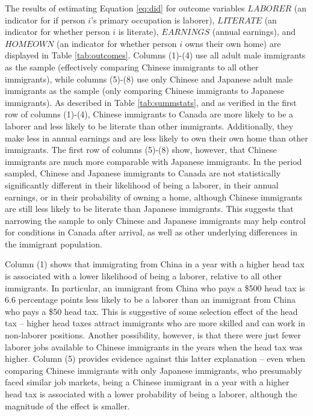 The results of estimating Equation \ref{eq:did} for outcome variables $LABORER$ (an indicator for if person $i$'s primary occupation is laborer), $LITERATE$ (an indicator for whether person $i$ is literate), $EARNINGS$ (annual earnings), and $HOMEOWN$ (an indicator for whether person $i$ owns their own home) are displayed in Table \ref{tab:outcomes}. Columns (1)-(4) use all adult male immigrants as the sample (effectively comparing Chinese immigrants to all other immigrants), while columns (5)-(8) use only Chinese and Japanese adult male immigrants as the sample (only comparing Chinese immigrants to Japanese immigrants). 
As described in Table \ref{tab:summstats}, and as verified in the first row of columns (1)-(4), Chinese immigrants to Canada are more likely to be a laborer and less likely to be literate than other immigrants. Additionally, they make less in annual earnings and are less likely to own their own home than other immigrants. The first row of columns (5)-(8) show, however, that Chinese immigrants are much more comparable with Japanese immigrants. In the period sampled, Chinese and Japanese immigrants to Canada are not statistically significantly different in their likelihood of being a laborer, in their annual earnings, or in their probability of owning a home, although Chinese immigrants are still less likely to be literate than Japanese immigrants. This suggests that narrowing the sample to only Chinese and Japanese immigrants may help control for conditions in Canada after arrival, as well as other underlying differences in the immigrant population.

Column (1) shows that immigrating from China in a year with a higher head tax is associated with a lower likelihood of being a laborer, relative to all other immigrants. In particular, an immigrant from China who pays a \$500 head tax is 6.6 percentage points less likely to be a laborer than an immigrant from China who pays a \$50 head tax. This is suggestive of some selection effect of the head tax -- higher head taxes attract immigrants who are more skilled and can work in non-laborer positions. Another possibility, however, is that there were just fewer laborer jobs available to Chinese immigrants in the years when the head tax was higher. 
Column (5) provides evidence against this latter explanation -- even when comparing Chinese immigrants with only Japanese immigrants, who presumably faced similar job markets, being a Chinese immigrant in a year with a higher head tax is associated with a lower probability of being a laborer, although the magnitude of the effect is smaller.

